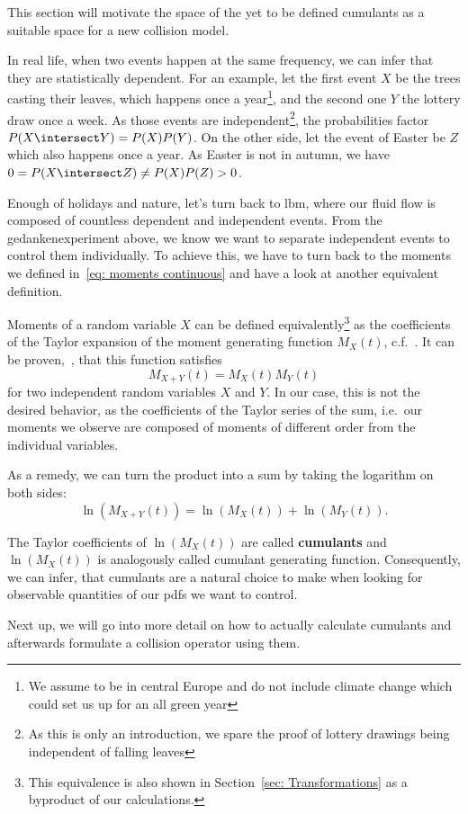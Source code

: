 
This section will motivate the space of the yet to be defined cumulants as a suitable space for a new collision model.

In real life, when two events happen at the same frequency, we can infer that they are statistically dependent.
For an example, let the first event $X$ be the trees casting their leaves, which happens once a year\footnote{We
assume to be in central Europe and do not include climate change which could set us up for an all green year},
and the second one $Y$ the lottery draw once a week.
As those events are independent\footnote{As
this is only an introduction, we spare the proof of lottery drawings being independent of falling leaves},
the probabilities factor $P(X\intersect Y) = P(X)P(Y)$.
On the other side, let the event of Easter be $Z$ which also happens once a year.
As Easter is not in autumn, we have $0 = P(X\intersect Z) \neq P(X)P(Z) > 0$.

Enough of holidays and nature, let's turn back to \gls{lbm}, where our fluid flow is composed of countless dependent and independent events.
From the gedankenexperiment above, we know we want to separate independent events to control them individually.
To achieve this, we have to turn back to the moments we defined in~\eqref{eq: moments continuous} and have a look at another equivalent definition.

Moments of a random variable $X$ can be defined equivalently\footnote{This equivalence is also shown in Section~\ref{sec: Transformations} as a byproduct of our calculations.
} as the coefficients of the Taylor expansion of the moment generating function $M_X(t)$, c.f.~\cite{weissteinMGF}.
It can be proven,~\cite{weissteinMGF}, that this function satisfies
\begin{equation}
\label{eq: moment generating function for independent variables}
  M_{X+Y}(t) = M_{X}(t)M_{Y}(t)
\end{equation}
for two independent random variables $X$ and $Y$.
In our case, this is not the desired behavior, as the coefficients of the Taylor series of the sum, i.e.\ our moments we observe are composed of moments of different order from the individual variables.

As a remedy, we can turn the product into a sum by taking the logarithm on both sides:
\begin{equation}
  \label{eq: cumulant generating function for independent variables}
  \ln(M_{X+Y}(t)) = \ln(M_{X}(t)) + \ln(M_{Y}(t)).
\end{equation}

The Taylor coefficients of $\ln(M_X(t))$ are called \textbf{cumulants} and $\ln(M_{X}(t))$ is analogously called cumulant generating function.
Consequently, we can infer, that cumulants are a natural choice to make when looking for observable quantities of our \glspl{pdf} we want to control.

Next up, we will go into more detail on how to actually calculate cumulants and afterwards formulate a collision operator using them.
